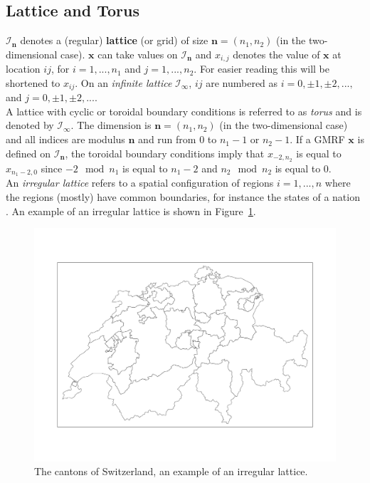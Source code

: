 \subsection{Lattice and Torus}
$\mathcal{I}_{\pmb{n}}$ denotes a (regular) \textbf{lattice} (or grid) of size $\pmb{n}=\left(n_1, n_2\right)$ (in the two-dimensional case). $\pmb{x}$ can take values on $\mathcal{I}_{\pmb{n}}$ and $x_{i,j}$ denotes the value of $\pmb{x}$ at location $ij$, for $i=1,...,n_1$ and $j=1,...,n_2$. For easier reading this will be shortened to $x_{ij}$. On an \textit{infinite lattice} $\mathcal{I}_{\pmb{\infty}}$, $ij$ are numbered as $i=0,\pm1,\pm2,...,$ and $j=0,\pm1,\pm2,...$. \\
A lattice with cyclic or toroidal boundary conditions is referred to as \textit{torus} and is denoted by $\mathcal{I}_{\pmb{\infty}}$. The dimension is $\pmb{n}=\left(n_1,n_2\right)$ (in the two-dimensional case) and all indices are modulus $\pmb{n}$ and run from 0 to $n_1-1$ or $n_2-1$. If a GMRF $\pmb{x}$ is defined on $\mathcal{I}_{\pmb{n}}$, the toroidal boundary conditions imply that $x_{-2,n_2}$ is equal to $x_{n_1-2,0}$ since $-2\mod n_1$ is equal to $n_1-2$ and $n_2\mod n_2$ is equal to 0.\\
An \textit{irregular lattice} refers to a spatial configuration of regions $i=1,...,n$ where the regions (mostly) have common boundaries, for instance the states of a nation \autocite[][15--16]{rue2005gaussian}. An example of an irregular lattice is shown in Figure~\ref{fig:lattice}.
\begin{figure}[H]
   \centering
       \includegraphics[page=1,width=.7\textwidth]{switzerland.pdf}
 \caption{The cantons of Switzerland, an example of an irregular lattice.}
 \label{fig:lattice}
\end{figure}
